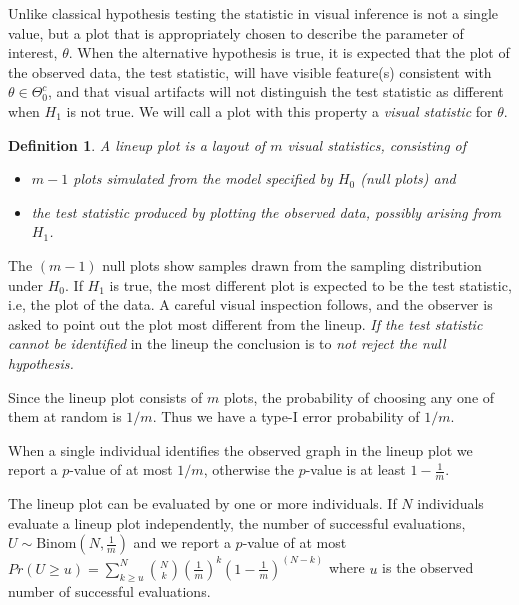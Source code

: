\documentclass{article}
\newtheorem{dfn}{Definition}[section]
\begin{document}

Unlike classical hypothesis testing the statistic in visual inference is not a single value, but a plot that is appropriately chosen to describe the parameter of interest, $\theta$. When the alternative hypothesis is true, it is expected that the plot of the observed data, the test statistic, will have visible feature(s) consistent with $\theta \in \Theta_0^c$, and that visual artifacts will not distinguish the test statistic as different when $H_1$ is not true. We will call a plot with this property a {\it visual statistic} for $\theta$.

\begin{dfn}\label{dfn:lplot}
A lineup plot is a layout of $m$ visual statistics, consisting of 
\begin{itemize}\itemsep-3pt
\item $m-1$ plots simulated from the model specified by $H_0$  (null plots) and 
\item the test statistic produced by plotting the observed data, possibly arising from $H_1$.
\end{itemize}
\end{dfn}

The $(m-1)$ null plots show samples drawn from the sampling distribution under $H_0$. %
If $H_1$ is true,  the most different plot is expected to be the test statistic, i.e, the plot of the data.  A careful visual inspection follows, and the observer is asked to point out the plot most different from the lineup.  {\em If the test statistic cannot be identified} in the lineup the conclusion is to {\em not reject the null hypothesis.}

Since the lineup plot consists of $m$ plots, the probability of choosing any one of them at random is $1/m$. Thus we have a type-I error probability of $1/m$.

When a single individual identifies the observed graph in the lineup plot we report a $p$-value of at most $1/m$, otherwise the $p$-value is at least $1-\frac 1m$. 

The lineup plot can be evaluated by one or more individuals.  If $N$ individuals evaluate a lineup plot independently, the number of successful evaluations, $U \sim \text{Binom} (N,\frac{1}{m})$ and we report a  $p$-value of at most $Pr(U \ge u)= \sum_{k \ge u}^N {{N \choose k} (\frac{1}{m})^k(1-\frac 1m)^{(N-k)}}$ where $u$ is the observed number of successful evaluations. %
\end{document}
